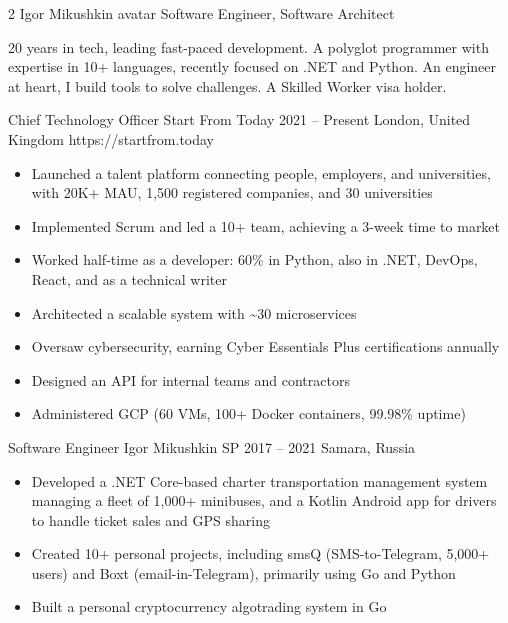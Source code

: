 \documentclass[9pt,a4paper]{igrmkcv}
\begin{document}
\begin{paracol}{2}
\cvMakeHeader
    {Igor Mikushkin}
    {avatar}
    {Software Engineer, Software Architect}

    20 years in tech, leading fast-paced development.
    A polyglot programmer with expertise in 10+ languages, recently focused on .NET and Python.
    An engineer at heart, I build tools to solve challenges.
    A Skilled Worker visa holder.

    \cvLeftEvent
        {Chief Technology Officer}
        {Start From Today}
        {2021 -- Present}
        {London, United Kingdom}
        {https://startfrom.today}

        \begin{itemize}
            \item Launched a talent platform connecting people, employers, and universities,
                  with 20K+ MAU, 1,500 registered companies, and 30 universities
            \item Implemented Scrum and led a 10+ team,
                  achieving a 3-week time to market
            \item Worked half-time as a developer: 60\% in Python,
                  also in .NET, DevOps, React, and as a technical writer
            \item Architected a scalable system with \textasciitilde 30 microservices
            \item Oversaw cybersecurity, earning Cyber Essentials Plus certifications annually
            \item Designed an API for internal teams and contractors
            \item Administered GCP (60 VMs, 100+ Docker containers, 99.98\% uptime)
        \end{itemize}

    \cvLeftEvent
        {Software Engineer}
        {Igor Mikushkin SP}
        {2017 -- 2021}
        {Samara, Russia}
        {}

        \begin{itemize}
            \item Developed a .NET Core-based charter transportation management system
                  managing a fleet of 1,000+ minibuses,
                  and a Kotlin Android app for drivers to handle ticket sales and GPS sharing
            \item Created 10+ personal projects,
                  including smsQ (SMS-to-Telegram, 5,000+ users)
                  and Boxt (email-in-Telegram), primarily using Go and Python
            \item Built a personal cryptocurrency algotrading system in Go
        \end{itemize}


\end{paracol}
\end{document}
